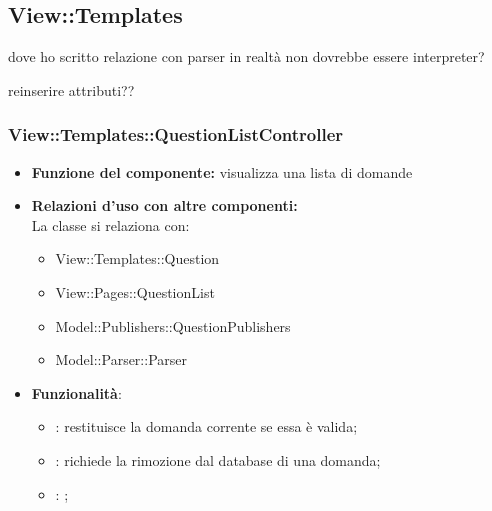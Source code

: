 \subsection{View::Templates}







dove ho scritto relazione con parser in realtà non dovrebbe essere interpreter?

reinserire attributi??




\subsubsection{View::Templates::QuestionListController}
\begin{itemize}
\item\textbf{Funzione del componente:} visualizza una lista di domande
				\item\textbf{Relazioni d'uso con altre componenti:} \\
La classe si relaziona con:
	\begin{itemize}
		\item View::Templates::Question
		\item View::Pages::QuestionList
		\item Model::Publishers::QuestionPublishers
		\item Model::Parser::Parser	
	\end{itemize}
\item\textbf{Funzionalità}:
\begin{itemize}
		\item{}: restituisce la domanda corrente se essa è valida;\\
		\item{}: richiede la rimozione dal database di una domanda;\\
		\item{}: ;\\
	\end{itemize}
\end{itemize}

